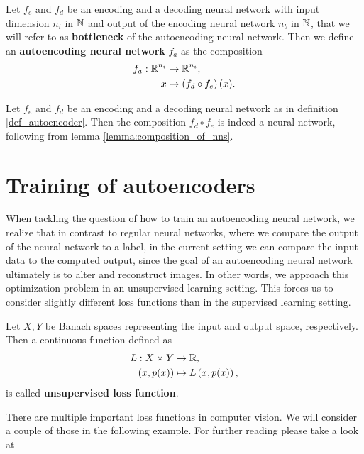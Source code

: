 \begin{definition}\label{def_autoencoder}
Let $f_e$ and $f_d$ be an encoding and a decoding neural network with input dimension $n_i$ in $\operatorname{\mathbb{N}}$ and output of the encoding neural network $n_b$ in $\operatorname{\mathbb{N}}$, that we will refer to as \textbf{bottleneck} of the autoencoding neural network.
Then we define an \textbf{autoencoding neural network} $f_a$ as the composition
\begin{align*}
f_a: \operatorname{\mathbb{R}}^{n_i} &\to \operatorname{\mathbb{R}}^{n_i},\\
x &\mapsto \left(f_d \circ f_e \right)(x).
\end{align*}
\end{definition}

\begin{remark}
Let $f_e$ and $f_d$ be an encoding and a decoding neural network as in definition \ref{def_autoencoder}. Then the composition $f_d \circ f_e$ is indeed a neural network, following from lemma \ref{lemma:composition_of_nns}.
\end{remark}


\section{Training of autoencoders}

When tackling the question of how to train an autoencoding neural network, we realize that in contrast to regular neural networks, where we compare the output of the neural network to a label, in the current setting we can compare the input data to the computed output, since the goal of an autoencoding neural network ultimately is to alter and reconstruct images. In other words, we approach this optimization problem in an unsupervised learning setting. This forces us to consider slightly different loss functions than in the supervised learning setting.


\begin{definition}
Let $X, Y$ be Banach spaces representing the input and output space, respectively.\\
Then a continuous function defined as
\begin{align*}
L:X\times Y &\to \operatorname{\mathbb{R}},\\
\left(x, p(x)\right) &\mapsto L\left(x, p(x)\right),
\end{align*}
is called \textbf{unsupervised loss function}.
\end{definition}


There are multiple important loss functions in computer vision. We will consider a couple of those in the following example. For further reading please take a look at \cite{foster2022generative}


